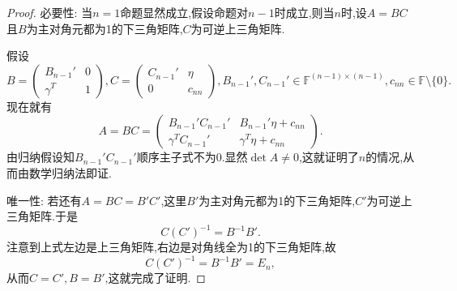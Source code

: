 \documentclass[../../main.tex]{subfiles}
\begin{document}
\begin{proof}
{\heiti 必要性:} 当\(n = 1\)命题显然成立,假设命题对\(n - 1\)时成立,则当\(n\)时,设\(A = BC\)且\(B\)为主对角元都为1的下三角矩阵,\(C\)为可逆上三角矩阵.

假设
\[
B = \begin{pmatrix}
B_{n - 1}' & 0 \\
\gamma^T & 1
\end{pmatrix}, C = \begin{pmatrix}
C_{n - 1}' & \eta \\
0 & c_{nn}
\end{pmatrix}, B_{n - 1}', C_{n - 1}' \in \mathbb{F}^{(n - 1) \times (n - 1)}, c_{nn} \in \mathbb{F} \setminus \{0\}.
\]
现在就有
\[
A = BC = \begin{pmatrix}
B_{n - 1}' C_{n - 1}' & B_{n - 1}' \eta + c_{nn} \\
\gamma^T C_{n - 1}' & \gamma^T \eta + c_{nn}
\end{pmatrix}.
\]
由归纳假设知\(B_{n - 1}' C_{n - 1}'\)顺序主子式不为0.显然\(\det A \neq 0\),这就证明了\(n\)的情况,从而由数学归纳法即证.

{\heiti 唯一性:} 若还有\(A = BC = B'C'\),这里\(B'\)为主对角元都为1的下三角矩阵,\(C'\)为可逆上三角矩阵.于是
\[
C (C')^{-1} = B^{-1} B'.
\]
注意到上式左边是上三角矩阵,右边是对角线全为1的下三角矩阵,故
\[
C (C')^{-1} = B^{-1} B' = E_n,
\]
从而\(C = C', B = B'\),这就完成了证明.
\end{proof}
\end{document}
